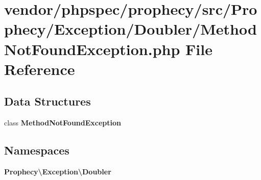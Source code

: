 \section{vendor/phpspec/prophecy/src/\+Prophecy/\+Exception/\+Doubler/\+Method\+Not\+Found\+Exception.php File Reference}
\label{prophecy_2src_2_prophecy_2_exception_2_doubler_2_method_not_found_exception_8php}
\subsection*{Data Structures}
\begin{DoxyCompactItemize}
\item 
class {\bf Method\+Not\+Found\+Exception}
\end{DoxyCompactItemize}
\subsection*{Namespaces}
\begin{DoxyCompactItemize}
\item 
 {\bf Prophecy\textbackslash{}\+Exception\textbackslash{}\+Doubler}
\end{DoxyCompactItemize}
